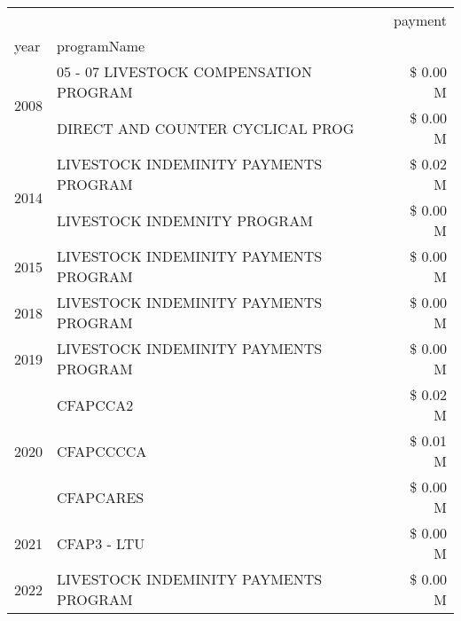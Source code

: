 \begin{tabular}{llr}
\toprule
 &  & payment \\
year & programName &  \\
\midrule
\multirow[t]{2}{*}{2008} & 05 - 07 LIVESTOCK COMPENSATION PROGRAM & \$ 0.00 M \\
 & DIRECT AND COUNTER CYCLICAL PROG & \$ 0.00 M \\
\cline{1-3}
\multirow[t]{2}{*}{2014} & LIVESTOCK INDEMINITY PAYMENTS PROGRAM & \$ 0.02 M \\
 & LIVESTOCK INDEMNITY PROGRAM & \$ 0.00 M \\
\cline{1-3}
2015 & LIVESTOCK INDEMINITY PAYMENTS PROGRAM & \$ 0.00 M \\
\cline{1-3}
2018 & LIVESTOCK INDEMINITY PAYMENTS PROGRAM & \$ 0.00 M \\
\cline{1-3}
2019 & LIVESTOCK INDEMINITY PAYMENTS PROGRAM & \$ 0.00 M \\
\cline{1-3}
\multirow[t]{3}{*}{2020} & CFAPCCA2 & \$ 0.02 M \\
 & CFAPCCCCA & \$ 0.01 M \\
 & CFAPCARES & \$ 0.00 M \\
\cline{1-3}
2021 & CFAP3 - LTU & \$ 0.00 M \\
\cline{1-3}
2022 & LIVESTOCK INDEMINITY PAYMENTS PROGRAM & \$ 0.00 M \\
\cline{1-3}
\bottomrule
\end{tabular}
